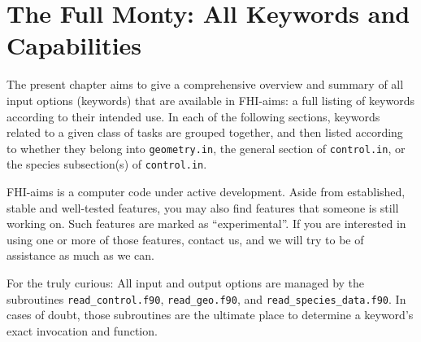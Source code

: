 \documentclass[12pt,a4paper,twoside,openany,titlepage,final]{book}
\begin{document}











\chapter{The Full Monty: All Keywords and Capabilities}
\label{Ch:full}

The present chapter aims to give a comprehensive overview and summary of all
input options (keywords) that are available in FHI-aims: a full listing of
keywords according to their intended use. In each of the following
sections, keywords related to a 
given class of tasks are grouped together, and then listed according
to whether they belong into \texttt{geometry.in}, the general section
of \texttt{control.in}, or the species subsection(s) of
\texttt{control.in}.  

FHI-aims is a computer
code under active development. Aside from established, stable and well-tested
features, you may also find features that someone is still working on. Such
features are marked as ``experimental''. If you are interested in using one or
more of those features, contact us, and we will try to be of assistance as
much as we can.

For the truly curious: All input and output options are managed by the
subroutines \texttt{read\_control.f90}, \texttt{read\_geo.f90}, and
\texttt{read\_species\_data.f90}. In cases of doubt, those subroutines
are the ultimate place to determine a keyword's exact invocation and
function.























\end{document}
